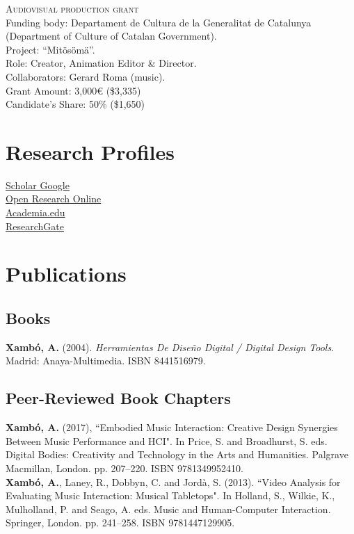 \documentclass[10pt, a4paper]{article}
\newcommand{\years}[1]{\marginnote{\scriptsize #1}}
\begin{document}
\years{09/1998--08/1999}\textsc{Audiovisual production grant} \\
Funding body: Departament de Cultura de la Generalitat de Catalunya (Department of Culture of Catalan Government).\\
Project: ``Mitösömä''.  \\
Role: Creator, Animation Editor \& Director.\\
Collaborators: Gerard Roma (music). \\
Grant Amount: 3,000€ (\$3,335) \\
Candidate’s Share: 50\% (\$1,650)  



\section*{Research Profiles}
\noindent

\textbullet \- \href{https://scholar.google.com/citations?user=yi3WXM8AAAAJ}{Scholar Google}\\
\textbullet \- \href{http://oro.open.ac.uk/view/person/ax22.html}{Open Research Online}\\
\textbullet \- \href{http://open.academia.edu/AnnaXambo}{Academia.edu}\\
\textbullet \- \href{http://www.researchgate.net/profile/Anna_Xambo}{ResearchGate}

\section*{Publications}
\noindent

\subsection*{Books}
\noindent
\years{2004}\textbf{Xambó, A.} (2004). \emph{Herramientas De Diseño Digital / Digital Design Tools}. Madrid: Anaya-Multimedia. ISBN 8441516979.

\subsection*{Peer-Reviewed Book Chapters}
\noindent
\years{2016}\textbf{Xambó, A.} (2017), “Embodied Music Interaction: Creative Design Synergies Between Music Performance and HCI". In Price, S. and Broadhurst, S. eds. Digital Bodies: Creativity and Technology in the Arts and Humanities. Palgrave Macmillan, London. pp. 207--220. ISBN 9781349952410.\\
\years{2013}\textbf{Xambó, A.}, Laney, R., Dobbyn, C. and Jordà, S. (2013). “Video Analysis for Evaluating Music Interaction: Musical Tabletops". In Holland, S., Wilkie, K., Mulholland, P. and Seago, A. eds. Music and Human-Computer Interaction. Springer, London. pp. 241--258. ISBN 9781447129905.
\end{document}
